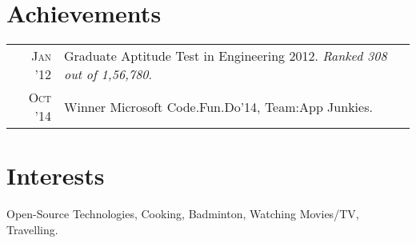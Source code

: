 \documentclass[a4paper,10pt]{article}
\begin{document}
\section{Achievements}
\begin{tabular}{rp{15cm}}
\textsc{Jan '12} & Graduate Aptitude Test in Engineering 2012. \emph{Ranked 308 out of 1,56,780}.\\
\textsc{Oct '14} & Winner Microsoft Code.Fun.Do’14, Team:App Junkies.\\
\end{tabular}

\section{Interests}
Open-Source Technologies, Cooking, Badminton, Watching Movies/TV, Travelling.

\end{document}
